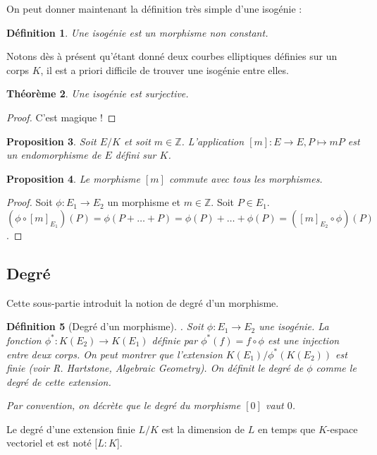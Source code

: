 \documentclass{article}
\theoremstyle{plain}%
\newtheorem{thm}{Théorème}[section]
\newtheorem{prop}[thm]{Proposition}
\newtheorem{deff}[thm]{Définition}
\theoremstyle{definition}%
\newcommand{\Z}{\mathbb{Z}}
\begin{document}
On peut donner maintenant la définition très simple d'une isogénie :

\begin{deff}
  Une isogénie est un morphisme non constant.
\end{deff}

Notons dès à présent qu'étant donné deux courbes elliptiques définies sur un corps $K$, il est a priori difficile de trouver une isogénie entre elles.

\begin{thm}
  Une isogénie est surjective.  
\end{thm}

\begin{proof}
  C'est magique !
\end{proof}

\begin{prop}
  Soit $E/K$ et soit $m\in\Z$. L'application $[m] : E \to E, P \mapsto mP$ est un endomorphisme de $E$ défini sur $K$. 
\end{prop}

\begin{prop}
  Le morphisme $[m]$ commute avec tous les morphismes. 
\end{prop}

\begin{proof}
  Soit $\phi : E_1\to E_2$ un morphisme et $m\in\Z$. Soit $P\in E_1$. $(\phi \circ [m]_{E_1})(P) = \phi(P + \ldots + P) = \phi(P) + \ldots + \phi(P) = ([m]_{E_2} \circ \phi)(P)$.
\end{proof}

\subsection{Degré}

Cette sous-partie introduit la notion de degré d'un morphisme.

\begin{deff}[Degré d'un morphisme]. 
  Soit $\phi : E_1 \to E_2$ une isogénie. La fonction $\phi^* : K(E_2) \to K(E_1)$ définie par $\phi^*(f) = f \circ \phi$ est une injection entre deux corps. On peut montrer que l'extension $K(E_1)/\phi^*(K(E_2))$ est finie (voir R. Hartstone, Algebraic Geometry). On définit le degré de $\phi$ comme le degré de cette extension.
  
  Par convention, on décrète que le degré du morphisme $[0]$ vaut $0$.
\end{deff}

Le degré d'une extension finie $L/K$ est la dimension de $L$ en temps que $K$-espace vectoriel et est noté $[L : K$].
\end{document}
